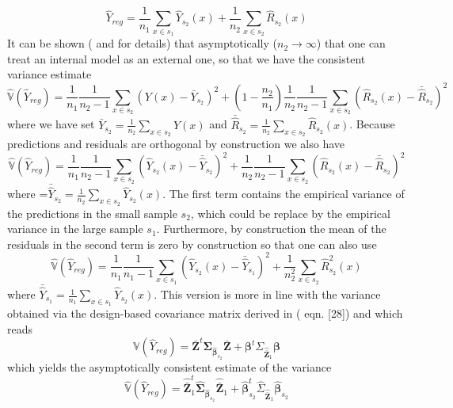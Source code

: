 \documentclass[a4paper,12pt,leqno, titlepage]{article}
\newcommand{\VAR}{\mathbb{V}}
\begin{document}
\begin{equation}\label{internal1}
\hat{Y}_{reg}=\frac{1}{n_1}\sum_{x\in{s_1}}\hat{Y}_{s_2}(x)+ \frac{1}{n_2}\sum_{x\in{s_2}}\hat{R}_{s_2}(x)
\end{equation}
It can be shown (\cite{mandallaz3} and \cite{mandallazreport1} for details) that asymptotically ($n_2 \to \infty$) that one can treat an internal model as an external one, so that we have the consistent variance estimate
\begin{equation}\label{estvarinternal1}
\hat{\VAR}(\hat{Y}_{reg})=\frac{1}{n_1}\frac{1}{n_2-1}\sum_{x\in{s_2}}(Y(x)-\bar{Y}_{s_2})^2+
(1-\frac{n_2}{n_1})\frac{1}{n_2}\frac{1}{n_2-1}\sum_{x\in{s_2}}(\hat{R}_{s_2}(x)-\bar{\hat{R}}_{s_2})^2
\end{equation}
where we have set $\bar{Y}_{s_2}=\frac{1}{n_2}\sum_{x\in{s_2}}Y(x)$ and $\bar{\hat{R}}_{s_2}=\frac{1}{n_2}\sum_{x\in{s_2}}\hat{R}_{s_2}(x)$.
Because predictions and residuals are orthogonal by construction we also have
\begin{equation}\label{estvarinternal3}
 \hat{\VAR}(\hat{Y}_{reg})=\frac{1}{n_1}\frac{1}{n_2-1}\sum_{x\in{s_2}}(\hat{Y}_{s_2}(x)-\bar{\hat{Y}}_{s_2})^2+
\frac{1}{n_2}\frac{1}{n_2-1}\sum_{x\in{s_2}}(\hat{R}_{s_2}(x)-\bar{\hat{R}}_{s_2})^2
\end{equation}
where =$\bar{\hat{Y}}_{s_2}=\frac{1}{n_2}\sum_{x\in{s_2}}\hat{Y}_{s_2}(x)$. The first term contains the empirical variance of the predictions in the small sample $s_2$, which could be replace by the empirical variance in the large sample $s_1$. Furthermore, by construction the mean of the residuals in the second term is zero by construction so that one can also use
\begin{equation}\label{estvarinternal4}
 \hat{\VAR}(\hat{Y}_{reg})=\frac{1}{n_1}\frac{1}{n_1-1}\sum_{x\in{s_1}}(\hat{Y}_{s_2}(x)-\bar{\hat{Y}}_{s_1})^2+
\frac{1}{n^2_2}\sum_{x\in{s_2}}\hat{R}^2_{s_2}(x)
\end{equation}
where $\bar{\hat{Y}}_{s_1}=\frac{1}{n_1}\sum_{x\in{s_1}}\hat{Y}_{s_2}(x)$. This version is more in line with the variance obtained via the design-based covariance matrix derived in (\cite{mandallazreport1} eqn. [28]) and which reads
\begin{equation}\label{varyreggweight}
\VAR(\hat{Y}_{reg})=
\bar{\pmb{Z}}^t\pmb{\Sigma}_{\hat{\pmb{\beta}}_{s_2}}\bar{\pmb{Z}}
+ \pmb{\beta}^t\Sigma_{\hat{\bar{\pmb{Z}}}_1}\pmb{\beta}
\end{equation}
which yields the asymptotically consistent estimate of the variance
\begin{equation}\label{estvaryreggweight}
\hat{\VAR}(\hat{Y}_{reg}) =
\hat{\bar{\pmb{Z}}}_{1}^t\hat{\pmb{\Sigma}}_{\hat{\pmb{\beta}}_{s_2}}\hat{\bar{\pmb{Z}}}_{1}
+ \hat{\pmb{\beta}}_{s_2}^t\hat{\Sigma}_{\hat{\bar{\pmb{Z}}}_{1}}\hat{\pmb{\beta}}_{s_2}
\end{equation}
\end{document}
